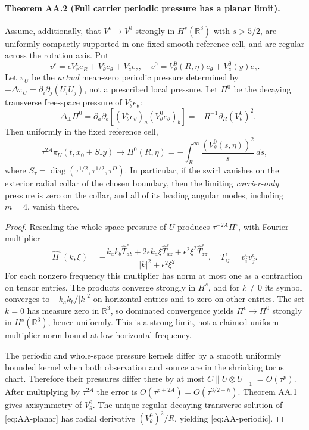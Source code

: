 \paragraph{Theorem AA.2 (Full carrier periodic pressure has a planar limit).}
Assume, additionally, that $V^\epsilon\to V^0$ strongly in $H^s(\mathbb R^3)$ with $s>5/2$, are uniformly compactly supported in one fixed smooth reference cell, and are regular across the rotation axis. Put
\[
 v^\epsilon=\epsilon V_r^\epsilon e_R+V_\theta^\epsilon e_\theta+V_z^\epsilon e_z,
 \quad v^0=V_\theta^0(R,\eta)e_\theta+V_z^0(y)e_z.
\]
Let $\pi_U$ be the \emph{actual} mean-zero periodic pressure determined by
$-\Delta\pi_U=\partial_i\partial_j(U_iU_j)$, not a prescribed local pressure. Let $\Pi^0$ be the decaying transverse free-space pressure of $V_\theta^0e_\theta$:
\begin{equation}\label{eq:AA-planar}
-\Delta_\perp\Pi^0
=\partial_a\partial_b[(V_\theta^0 e_\theta)_a(V_\theta^0 e_\theta)_b]
=-R^{-1}\partial_R(V_\theta^0)^2.
\end{equation}
Then uniformly in the fixed reference cell,
\begin{equation}\label{eq:AA-periodic}
\boxed{\tau^{2A}\pi_U(t,x_0+S_\tau y)\longrightarrow
\Pi^0(R,\eta)=-\int_R^\infty\frac{(V_\theta^0(s,\eta))^2}{s}\,ds,}
\end{equation}
where $S_\tau=\operatorname{diag}(\tau^{1/2},\tau^{1/2},\tau^D)$.
In particular, if the swirl vanishes on the exterior radial collar of the chosen boundary, then the limiting \emph{carrier-only} pressure is zero on the collar, and all of its leading angular modes, including $m=4$, vanish there.
\begin{proof}
Rescaling the whole-space pressure of $U$ produces $\tau^{-2A}\Pi^\epsilon$, with Fourier multiplier
\[
\widehat\Pi^\epsilon(k,\xi)=-
\frac{k_a k_b\widehat T_{ab}^\epsilon+
2\epsilon k_a\xi\widehat T_{az}^\epsilon+
\epsilon^2\xi^2\widehat T_{zz}^\epsilon}
{|k|^2+\epsilon^2\xi^2},\quad
T_{ij}^\epsilon=v_i^\epsilon v_j^\epsilon.
\]
For each nonzero frequency this multiplier has norm at most one as a contraction on tensor entries. The products converge strongly in $H^s$, and for $k\ne0$ its symbol converges to $-k_a k_b/|k|^2$ on horizontal entries and to zero on other entries. The set $k=0$ has measure zero in $\mathbb R^3$, so dominated convergence yields $\Pi^\epsilon\to\Pi^0$ strongly in $H^s(\mathbb R^3)$, hence uniformly. This is a strong limit, not a claimed uniform multiplier-norm bound at low horizontal frequency.

The periodic and whole-space pressure kernels differ by a smooth uniformly bounded kernel when both observation and source are in the shrinking torus chart. Therefore their pressures differ there by at most $C\|U\otimes U\|_1=O(\tau^p)$. After multiplying by $\tau^{2A}$ the error is $O(\tau^{p+2A})=O(\tau^{3/2-h})$. Theorem AA.1 gives axisymmetry of $V_\theta^0$. The unique regular decaying transverse solution of \eqref{eq:AA-planar} has radial derivative $(V_\theta^0)^2/R$, yielding \eqref{eq:AA-periodic}. \end{proof}

